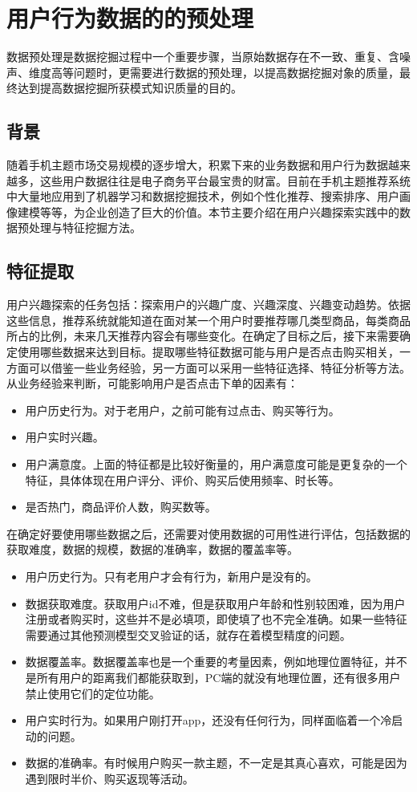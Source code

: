 \section{用户行为数据的的预处理}
数据预处理是数据挖掘过程中一个重要步骤，当原始数据存在不一致、重复、含噪声、维度高等问题时，更需要进行数据的预处理，以提高数据挖掘对象的质量，最终达到提高数据挖掘所获模式知识质量的目的。
  \subsection{背景}
  随着手机主题市场交易规模的逐步增大，积累下来的业务数据和用户行为数据越来越多，这些用户数据往往是电子商务平台最宝贵的财富。目前在手机主题推荐系统中大量地应用到了机器学习和数据挖掘技术，例如个性化推荐、搜索排序、用户画像建模等等，为企业创造了巨大的价值。本节主要介绍在用户兴趣探索实践中的数据预处理与特征挖掘方法。

  \subsection{特征提取}
  用户兴趣探索的任务包括：探索用户的兴趣广度、兴趣深度、兴趣变动趋势。依据这些信息，推荐系统就能知道在面对某一个用户时要推荐哪几类型商品，每类商品所占的比例，未来几天推荐内容会有哪些变化。在确定了目标之后，接下来需要确定使用哪些数据来达到目标。提取哪些特征数据可能与用户是否点击购买相关，一方面可以借鉴一些业务经验，另一方面可以采用一些特征选择、特征分析等方法。从业务经验来判断，可能影响用户是否点击下单的因素有：
  \begin{itemize}
  \item 用户历史行为。对于老用户，之前可能有过点击、购买等行为。
  \item 用户实时兴趣。
  \item 用户满意度。上面的特征都是比较好衡量的，用户满意度可能是更复杂的一个特征，具体体现在用户评分、评价、购买后使用频率、时长等。
  \item 是否热门，商品评价人数，购买数等。
  \end{itemize}
  在确定好要使用哪些数据之后，还需要对使用数据的可用性进行评估，包括数据的获取难度，数据的规模，数据的准确率，数据的覆盖率等。
  \begin{itemize}
  \item 用户历史行为。只有老用户才会有行为，新用户是没有的。
  \item 数据获取难度。获取用户id不难，但是获取用户年龄和性别较困难，因为用户注册或者购买时，这些并不是必填项，即使填了也不完全准确。如果一些特征需要通过其他预测模型交叉验证的话，就存在着模型精度的问题。
  \item 数据覆盖率。数据覆盖率也是一个重要的考量因素，例如地理位置特征，并不是所有用户的距离我们都能获取到，PC端的就没有地理位置，还有很多用户禁止使用它们的定位功能。
  \item 用户实时行为。如果用户刚打开app，还没有任何行为，同样面临着一个冷启动的问题。
  \item 数据的准确率。有时候用户购买一款主题，不一定是其真心喜欢，可能是因为遇到限时半价、购买返现等活动。
  \end{itemize}

